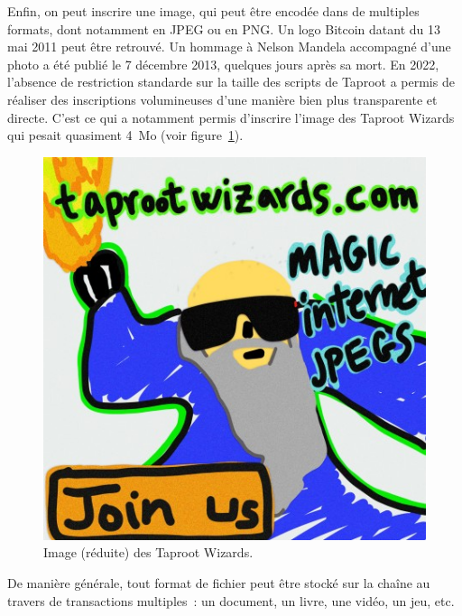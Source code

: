 Enfin, on peut inscrire une image, qui peut être encodée dans de multiples formats, dont notamment en JPEG ou en PNG. Un logo Bitcoin datant du 13 mai 2011 peut être retrouvé. Un hommage à Nelson Mandela accompagné d'une photo a été publié le 7 décembre 2013, quelques jours après sa mort. En 2022, l'absence de restriction standarde sur la taille des scripts de Taproot a permis de réaliser des inscriptions volumineuses d'une manière bien plus transparente et directe. C'est ce qui a notamment permis d'inscrire l'image des Taproot Wizards qui pesait quasiment 4~Mo (voir figure~\ref{fig:taproot-wizards}).

\begin{figure}[h]
  \centering
  \includegraphics[scale=0.6]{img/taproot-wizards-small-0301e0480b374b32851a9462db29dc19fe830a7f7d7a88b81612b9d42099c0aei0.jpg}
  \caption{Image (réduite) des Taproot Wizards.}
  \label{fig:taproot-wizards}
\end{figure}

De manière générale, tout format de fichier peut être stocké sur la chaîne au travers de transactions multiples~: un document, un livre, une vidéo, un jeu, etc.

